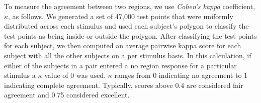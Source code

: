 \documentclass[11pt,letterpaper]{article}
\begin{document}
To measure the agreement between two regions, we use \textit{Cohen's kappa} coefficient, $\kappa$, as follows.  We generated a set of 47,000 test points that were uniformly distributed across each stimulus and used each subject's polygon to classify the test points as being inside or outside the polygon. After classifying the test points for each subject, we then computed an average pairwise kappa score for each subject with all the other subjects on a per stimulus basis. In this calculation, if either of the subjects in a pair entered a no region response for a particular stimulus a $\kappa$ value of 0 was used.  $\kappa$ ranges from 0 indicating no agreement to 1 indicating complete agreement.  Typically, scores above 0.4 are considered fair agreement and 0.75 considered excellent.


\renewcommand{\thefootnote}{\fnsymbol{footnote}}
\end{document}
